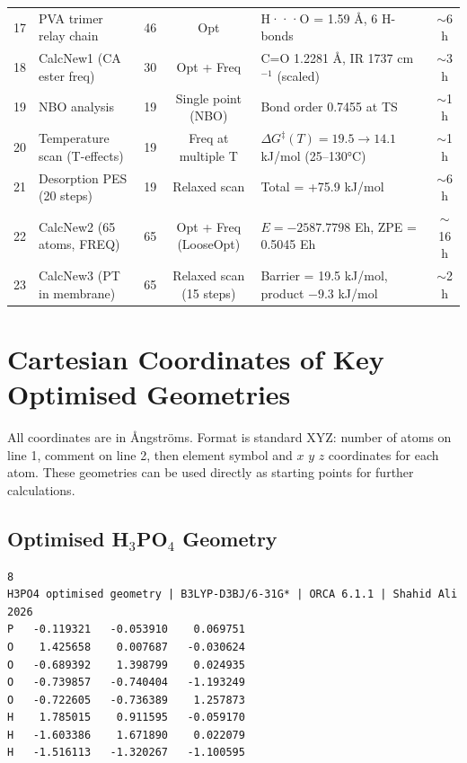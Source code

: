 \documentclass[12pt,a4paper]{report}
\begin{document}
\begin{table}[h!]
\begin{tabular}{c l c c l c}
17 & PVA trimer relay chain & 46 & Opt & H···O = 1.59 Å, 6 H-bonds & \(\sim\)6 h \\
18 & CalcNew1 (CA ester freq) & 30 & Opt + Freq & C=O 1.2281 Å, IR 1737 cm\(^{-1}\) (scaled) & \(\sim\)3 h \\
19 & NBO analysis & 19 & Single point (NBO) & Bond order 0.7455 at TS & \(\sim\)1 h \\
20 & Temperature scan (T-effects) & 19 & Freq at multiple T & \(\Delta G^{\ddagger}(T) = 19.5 \rightarrow 14.1\) kJ/mol (25–130°C) & \(\sim\)1 h \\
21 & Desorption PES (20 steps) & 19 & Relaxed scan & Total = +75.9 kJ/mol & \(\sim\)6 h \\
22 & CalcNew2 (65 atoms, FREQ) & 65 & Opt + Freq (LooseOpt) & \(E = -2587.7798\) Eh, ZPE = 0.5045 Eh & \(\sim\)16 h \\
23 & CalcNew3 (PT in membrane) & 65 & Relaxed scan (15 steps) & Barrier = 19.5 kJ/mol, product \(-9.3\) kJ/mol & \(\sim\)2 h \\
\bottomrule
\end{tabular}
\end{table}

\chapter{Cartesian Coordinates of Key Optimised Geometries}

All coordinates are in Ångströms. Format is standard XYZ: number of atoms on line 1, comment on line 2, then element symbol and \(x\) \(y\) \(z\) coordinates for each atom. These geometries can be used directly as starting points for further calculations.

\section{Optimised H\(_3\)PO\(_4\) Geometry}

\begin{verbatim}
8
H3PO4 optimised geometry | B3LYP-D3BJ/6-31G* | ORCA 6.1.1 | Shahid Ali 2026
P   -0.119321   -0.053910    0.069751
O    1.425658    0.007687   -0.030624
O   -0.689392    1.398799    0.024935
O   -0.739857   -0.740404   -1.193249
O   -0.722605   -0.736389    1.257873
H    1.785015    0.911595   -0.059170
H   -1.603386    1.671890    0.022079
H   -1.516113   -1.320267   -1.100595
\end{verbatim}
\end{document}
